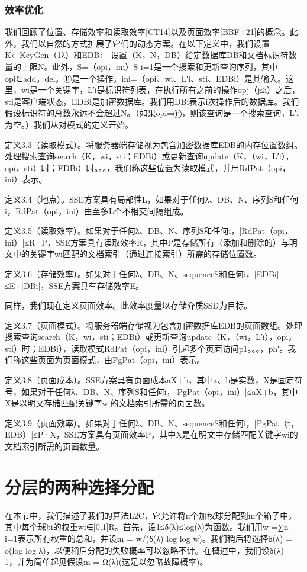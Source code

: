 \documentclass[UTF8]{article}
\begin{document}
\subsubsection{效率优化}

我们回顾了位置、存储效率和读取效率[CT14]以及页面效率[BBF+21]的概念。此外，我们以自然的方式扩展了它们的动态方案。在以下定义中，我们设置K←KeyGen（1λ）和EDB← 设置（K，N，DB）给定数据库DB和文档标识符数量的上限N。此外，S=（opi，ini）S i=1是一个搜索和更新查询序列，其中opi∈{add，del，⑪}是一个操作，ini=（opi、wi、L′i、sti、EDBi）是其输入。这里，wi是一个关键字，L′i是标识符列表，在执行所有之前的操作opj（j≤i）之后，sti是客户端状态，EDBi是加密数据库。我们用DBi表示i次操作后的数据库。我们假设标识符的总数永远不会超过N。（如果opi=⑪，则该查询是一个搜索查询，L′i为空。）我们从对模式的定义开始。

定义3.3（读取模式）。将服务器端存储视为包含加密数据库EDB的内存位置数组。处理搜索查询search（K，wi，sti；EDBi）或更新查询update（K，（wi，L′i），opi，sti）时；EDBi）时。。。，我们称这些位置为读取模式，并用RdPat（opi，ini）表示。

定义3.4（地点）。SSE方案具有局部性L，如果对于任何λ、DB、N、序列S和任何i，RdPat（opi，ini）由至多L个不相交间隔组成。

定义3.5（读取效率）。如果对于任何λ、DB、N、序列S和任何i，|RdPat（opi，ini）|≤R·P，SSE方案具有读取效率R，其中P是存储所有（添加和删除的）与明文中的关键字wi匹配的文档索引（通过连接索引）所需的存储位置数。

定义3.6（存储效率）。如果对于任何λ、DB、N、sequenceS和任何i，|EDBi|≤E·|DBi|，SSE方案具有存储效率E。

同样，我们现在定义页面效率。此效率度量以存储介质SSD为目标。

定义3.7（页面模式）。将服务器端存储视为包含加密数据库EDB的页面数组。处理搜索查询search（K，wi，sti；EDBi）或更新查询update（K，（wi，L′i），opi，sti）时；EDBi），读取模式RdPat（opi，ini）引起多个页面访问p1。。。，ph′。我们称这些页面为页面模式，由PgPat（opi，ini）表示。

定义3.8（页面成本）。SSE方案具有页面成本aX+b，其中a、b是实数，X是固定符号，如果对于任何λ、DB、N、序列S和任何i，|PgPat（opi，ini）|≤aX+b，其中X是以明文存储匹配关键字wi的文档索引所需的页面数。

定义3.9（页面效率）。如果对于任何λ、DB、N、sequenceS和任何i，|PgPat（τ，EDB）|≤P·X，SSE方案具有页面效率P，其中X是在明文中存储匹配关键字wi的文档索引所需的页面数量。

\section{分层的两种选择分配}
在本节中，我们描述了我们的算法L2C，它允许将n个加权球分配到m个箱子中，其中每个球bi的权重wi∈[0,1]R。首先，设1≤δ(λ)≤log(λ)为函数。我们用w =∑n i=1表示所有权重的总和，并设m = w/(δ(λ) log log w)。我们稍后将选择δ(λ) = o(log log λ)，以便稍后分配的失败概率可以忽略不计。在概述中，我们设δ(λ) = 1，并为简单起见假设m = Ω(λ)(这足以忽略故障概率)。
\end{document}
